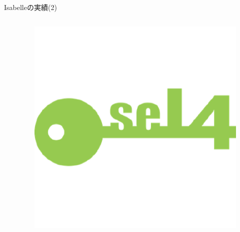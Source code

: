 \documentclass[17pt,aspectratio=169]{beamer}
\begin{document}
\begin{frame}{Isabelleの実績(2)}
\begin{columns}
\begin{column}{0.75\textwidth}
        \end{column}
        \begin{column}{0.25\textwidth}
            \begin{figure}
                \hspace{-2cm}
                \includegraphics[width=1.3\linewidth]{./images/sel4-logo.png } 
            \end{figure}
        \end{column}
    \end{columns}
\end{frame}
\end{document}
